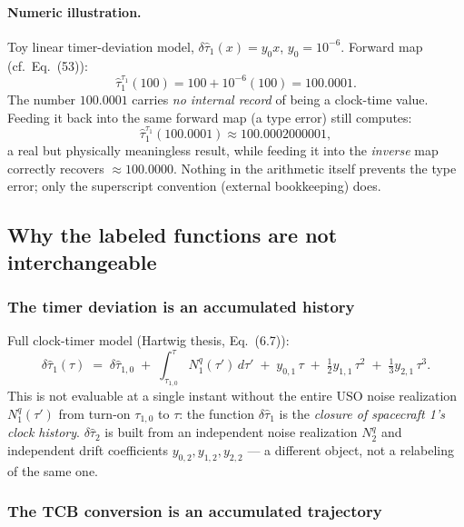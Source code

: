 \documentclass[11pt]{article}
\begin{document}
\paragraph{Numeric illustration.} Toy linear timer-deviation model, $\delta\hat\tau_1(x) = y_0 x$, $y_0 = 10^{-6}$. Forward map (cf.\ Eq.~(53)):
\begin{equation*}
  \hat\tau_1^{\tau_1}(100) = 100 + 10^{-6}(100) = 100.0001 .
\end{equation*}
The number $100.0001$ carries \emph{no internal record} of being a clock-time value. Feeding it back into the same forward map (a type error) still computes:
\begin{equation*}
  \hat\tau_1^{\tau_1}(100.0001) \approx 100.0002000001,
\end{equation*}
a real but physically meaningless result, while feeding it into the \emph{inverse} map correctly recovers $\approx 100.0000$. Nothing in the arithmetic itself prevents the type error; only the superscript convention (external bookkeeping) does.

\subsection{Why the labeled functions are not interchangeable}

\subsubsection{The timer deviation is an accumulated history}

Full clock-timer model (Hartwig thesis, Eq.~(6.7)):
\begin{equation*}
  \delta\hat\tau_1(\tau) \;=\; \delta\hat\tau_{1,0}
  \;+\; \int_{\tau_{1,0}}^{\tau} N_1^{q}(\tau')\,d\tau'
  \;+\; y_{0,1}\,\tau \;+\; \tfrac{1}{2} y_{1,1}\,\tau^2
  \;+\; \tfrac{1}{3} y_{2,1}\,\tau^3 . \tag{6.7}
\end{equation*}
This is not evaluable at a single instant without the entire USO noise
realization $N_1^q(\tau')$ from turn-on $\tau_{1,0}$ to $\tau$: the
function $\delta\hat\tau_1$ is the \emph{closure of spacecraft 1's
clock history}. $\delta\hat\tau_2$ is built from an independent noise
realization $N_2^q$ and independent drift coefficients
$y_{0,2},y_{1,2},y_{2,2}$ — a different object, not a relabeling of
the same one.

\subsubsection{The TCB conversion is an accumulated trajectory}
\end{document}
